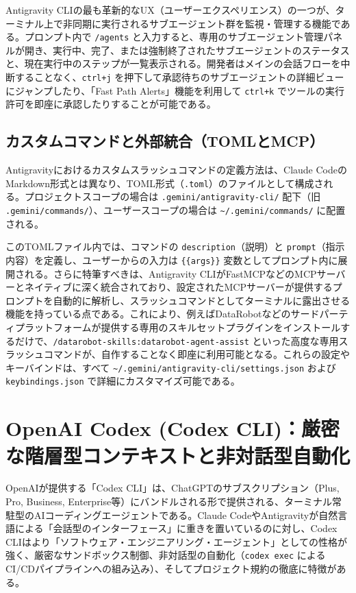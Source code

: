 \documentclass[a4paper,11pt]{ltjsarticle}
\newcommand{\cmd}[1]{\texttt{#1}}
\newcommand{\home}{\textasciitilde}
\begin{document}
Antigravity CLIの最も革新的なUX（ユーザーエクスペリエンス）の一つが、ターミナル上で非同期に実行されるサブエージェント群を監視・管理する機能である。プロンプト内で \cmd{/agents} と入力すると、専用のサブエージェント管理パネルが開き、実行中、完了、または強制終了されたサブエージェントのステータスと、現在実行中のステップが一覧表示される\cite{r28}。開発者はメインの会話フローを中断することなく、\cmd{ctrl+j} を押下して承認待ちのサブエージェントの詳細ビューにジャンプしたり、「Fast Path Alerts」機能を利用して \cmd{ctrl+k} でツールの実行許可を即座に承認したりすることが可能である\cite{r28}。

\subsection{カスタムコマンドと外部統合（TOMLとMCP）}

Antigravityにおけるカスタムスラッシュコマンドの定義方法は、Claude CodeのMarkdown形式とは異なり、TOML形式（\cmd{.toml}）のファイルとして構成される。プロジェクトスコープの場合は \cmd{.gemini/antigravity-cli/} 配下（旧 \cmd{.gemini/commands/}）、ユーザースコープの場合は \cmd{\home/.gemini/commands/} に配置される\cite{r18}。

このTOMLファイル内では、コマンドの \cmd{description}（説明）と \cmd{prompt}（指示内容）を定義し、ユーザーからの入力は \cmd{\{\{args\}\}} 変数としてプロンプト内に展開される\cite{r32}。さらに特筆すべきは、Antigravity CLIがFastMCPなどのMCPサーバーとネイティブに深く統合されており、設定されたMCPサーバーが提供するプロンプトを自動的に解析し、スラッシュコマンドとしてターミナルに露出させる機能を持っている点である\cite{r26}。これにより、例えばDataRobotなどのサードパーティプラットフォームが提供する専用のスキルセットプラグインをインストールするだけで、\cmd{/datarobot-skills:datarobot-agent-assist} といった高度な専用スラッシュコマンドが、自作することなく即座に利用可能となる\cite{r24}。これらの設定やキーバインドは、すべて \cmd{\home/.gemini/antigravity-cli/settings.json} および \cmd{keybindings.json} で詳細にカスタマイズ可能である\cite{r28}。

\section{OpenAI Codex (Codex CLI)：厳密な階層型コンテキストと非対話型自動化}

OpenAIが提供する「Codex CLI」は、ChatGPTのサブスクリプション（Plus, Pro, Business, Enterprise等）にバンドルされる形で提供される、ターミナル常駐型のAIコーディングエージェントである\cite{r18}。Claude CodeやAntigravityが自然言語による「会話型のインターフェース」に重きを置いているのに対し、Codex CLIはより「ソフトウェア・エンジニアリング・エージェント」としての性格が強く、厳密なサンドボックス制御、非対話型の自動化（\cmd{codex exec} によるCI/CDパイプラインへの組み込み）、そしてプロジェクト規約の徹底に特徴がある\cite{r18}。
\end{document}
